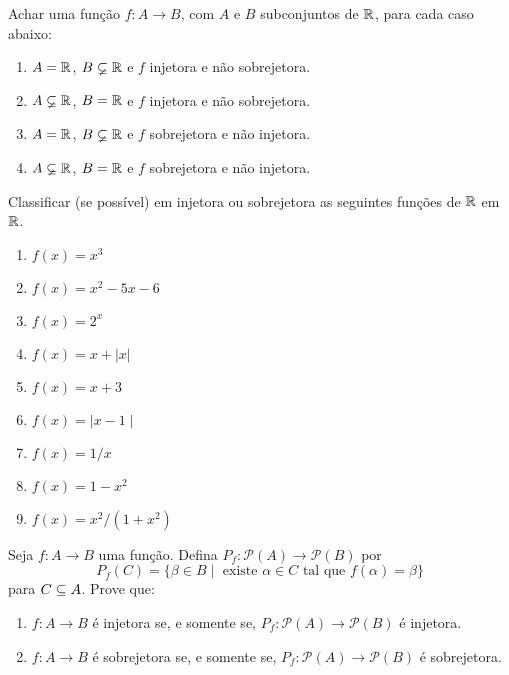 \documentclass[12pt]{exam}
\begin{document}
\vspace{.3cm}

\questao{} Achar uma função $f : A \to B$, com $A$ e $B$ subconjuntos de $\mathbb{R}$, para cada caso abaixo:
\begin{enumerate}[label={\alph*})]
    \item $A = \mathbb{R}$, $B \varsubsetneq \mathbb{R}$ e $f$ injetora e não sobrejetora.

    \item $A \varsubsetneq \mathbb{R}$, $B = \mathbb{R}$ e $f$ injetora e não sobrejetora.

    \item $A = \mathbb{R}$, $B \varsubsetneq \mathbb{R}$ e $f$ sobrejetora e não injetora.

    \item $A \varsubsetneq \mathbb{R}$, $B = \mathbb{R}$ e $f$ sobrejetora e não injetora.
\end{enumerate}

\vspace{.3cm}

\questao{} Classificar (se possível) em injetora ou sobrejetora as seguintes funções de $\mathbb{R}$ em $\mathbb{R}$.

\begin{multicols}{2}
    \begin{enumerate}[label={\alph*})]
        \item $f(x) = x^3$

        \item $f(x) = x^2 - 5x - 6$

        \item $f(x) = 2^x$

        \item $f(x) = x + | x |$

        \item $f(x) = x + 3$

        \item $f(x) = \mid x - 1\mid$

        \item $f(x) = 1/x$

        \item $f(x) = 1 - x^2$

        \item $f(x) = x^2/(1 + x^2)$
    \end{enumerate}
\end{multicols}

\vspace{.3cm}

\questao{} Seja $f : A \to B$ uma função. Defina $P_f : \mathcal{P}(A) \to \mathcal{P}(B)$ por
\[
P_f(C) = \{\beta \in B \mid \mbox{ existe } \alpha \in C \mbox{ tal que } f(\alpha) = \beta\}
\]
para $C \subseteq A$. Prove que:
\begin{enumerate}[label={\roman*})]

    \item $f : A \to B$ é injetora se, e somente se, $P_f : \mathcal{P}(A) \to \mathcal{P}(B)$ é injetora.

    \item $f : A \to B$ é sobrejetora se, e somente se, $P_f : \mathcal{P}(A) \to \mathcal{P}(B)$ é sobrejetora.
\end{enumerate}
\end{document}
